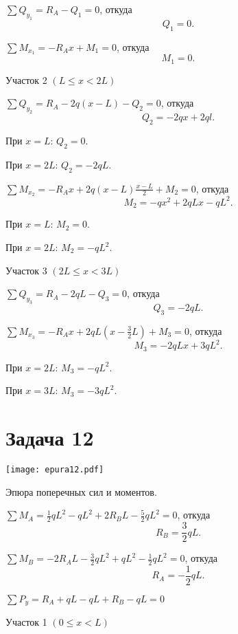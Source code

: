 $\sum Q_{y_1} = R_A - Q_1 = 0 $,
откуда
\[
    Q_1 = 0.
\]

$\sum M_{x_1} = -R_A x + M_1 = 0 $,
откуда
\[
    M_1 = 0.
\]

\vspace{1.5ex}

Участок 2 $\left(L \le x < 2L\right)$

$\sum Q_{y_2} = R_A - 2q(x - L) - Q_2 = 0$,
откуда
\[
    Q_2 = -2qx + 2ql.
\]

При $x = L$: $Q_2 = 0$.

При $x = 2L$: $Q_2 = -2qL$.

$\sum M_{x_2} = -R_A x + 2q (x - L) \frac{x-L}{2} + M_2 = 0$,
откуда
\[
    M_2 = -qx^2 + 2qLx - qL^2.
\]

При $x = L$: $M_2 = 0$.

При $x = 2L$: $M_2 = -qL^2$.

\vspace{1.5ex}

Участок 3 $\left(2L \le x < 3L\right)$

$\sum Q_{y_3} = R_A - 2qL - Q_3 = 0$,
откуда
\[
    Q_3 = -2qL.
\]

$\sum M_{x_3} = -R_A x + 2q L \left(x - \frac{3}{2} L\right) + M_3 = 0$,
откуда
\[
    M_3 = -2qLx + 3qL^2.
\]

При $x = 2L$: $M_3 = -qL^2$.

При $x = 3L$: $M_3 = -3qL^2$.

\newpage


\section{Задача 12}

\begin{floatingfigure}[r]{0.5\textwidth}
    \centering
    \texttt{[image: epura12.pdf]}
    \caption{Эпюра поперечных сил и моментов.}
    \label{fig:chap1-epura12}
\end{floatingfigure}

$\sum M_A = \frac{1}{2} q L^2 - q L^2 + 2 R_B L - \frac{5}{2} q L^2 = 0$,
откуда
\[
    R_B = \frac{3}{2} qL.
\]

$ \sum M_B = -2 R_A L - \frac{3}{2} q L^2 + q L^2 - \frac{1}{2} q L^2 = 0 $,
откуда
\[
    R_A = -\frac{1}{2} qL.
\]

$\sum P_y = R_A + qL - qL + R_B - qL = 0$

\vspace{1.5ex}

Участок 1 $\left(0 \le x < L\right)$

